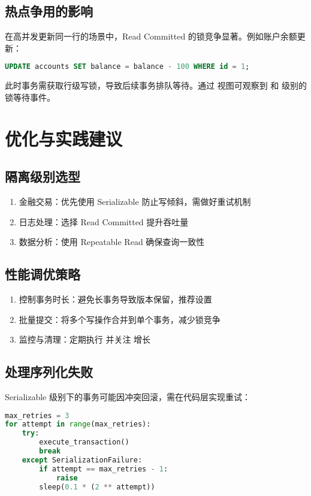 \section{热点争用的影响}
在高并发更新同一行的场景中，Read Committed 的锁竞争显著。例如账户余额更新：\par
\begin{lstlisting}[language=sql]
UPDATE accounts SET balance = balance - 100 WHERE id = 1;
\end{lstlisting}
此时事务需获取行级写锁，导致后续事务排队等待。通过  视图可观察到  和  级别的锁等待事件。\par
\chapter{优化与实践建议}
\section{隔离级别选型}
\begin{enumerate}
\item 金融交易：优先使用 Serializable 防止写倾斜，需做好重试机制
\item 日志处理：选择 Read Committed 提升吞吐量
\item 数据分析：使用 Repeatable Read 确保查询一致性
\end{enumerate}
\section{性能调优策略}
\begin{enumerate}
\item 控制事务时长：避免长事务导致版本保留，推荐设置 
\item 批量提交：将多个写操作合并到单个事务，减少锁竞争
\item 监控与清理：定期执行  并关注  增长
\end{enumerate}
\section{处理序列化失败}
Serializable 级别下的事务可能因冲突回滚，需在代码层实现重试：\par
\begin{lstlisting}[language=python]
max_retries = 3
for attempt in range(max_retries):
    try:
        execute_transaction()
        break
    except SerializationFailure:
        if attempt == max_retries - 1:
            raise
        sleep(0.1 * (2 ** attempt))
\end{lstlisting}
